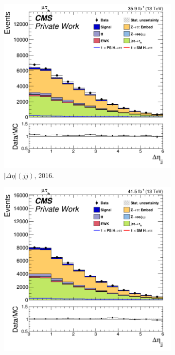 \begin{figure}
  \begin{subfigure}[b]{0.33\linewidth}
    \centering
    \includegraphics[width=\linewidth]{Chapitre7/Images/CtrlPlots/2016/DijetDeltaEta.png} 
    \caption{$|\Delta\eta|(jj)$, 2016.} 
    \vspace{0.5ex}
  \end{subfigure}%
  \begin{subfigure}[b]{0.33\linewidth}
    \centering
    \includegraphics[width=\linewidth]{Chapitre7/Images/CtrlPlots/2017/DijetDeltaEta.png} 

\end{subfigure}
\end{figure}
